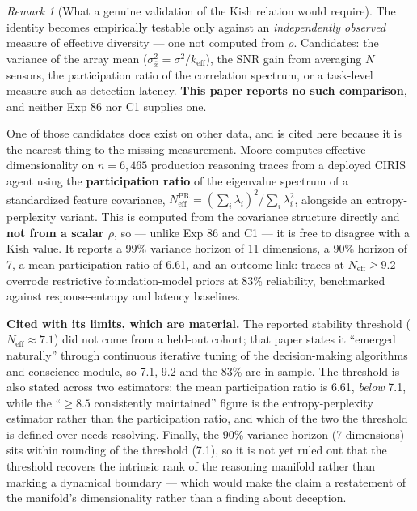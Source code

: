\documentclass[11pt,a4paper]{article}
\theoremstyle{definition}
\theoremstyle{remark}
\newtheorem{remark}{Remark}[section]
\newcommand{\keff}{k_{\text{eff}}}
\begin{document}
\begin{remark}[What a genuine validation of the Kish relation would require]
The identity becomes empirically testable only against an \emph{independently observed} measure of effective diversity --- one not computed from $\rho$. Candidates: the variance of the array mean ($\sigma^2_{\bar{x}} = \sigma^2/\keff$), the SNR gain from averaging $N$ sensors, the participation ratio of the correlation spectrum, or a task-level measure such as detection latency. \textbf{This paper reports no such comparison}, and neither Exp 86 nor C1 supplies one.

One of those candidates does exist on other data, and is cited here because it is the nearest thing to the missing measurement. Moore \cite{crc2026} computes effective dimensionality on $n = 6{,}465$ production reasoning traces from a deployed CIRIS agent using the \textbf{participation ratio} of the eigenvalue spectrum of a standardized feature covariance, $N_{\text{eff}}^{\text{PR}} = (\sum_i \lambda_i)^2 / \sum_i \lambda_i^2$, alongside an entropy-perplexity variant. This is computed from the covariance structure directly and \textbf{not from a scalar $\rho$}, so --- unlike Exp 86 and C1 --- it is free to disagree with a Kish value. It reports a 99\% variance horizon of 11 dimensions, a 90\% horizon of 7, a mean participation ratio of 6.61, and an outcome link: traces at $N_{\text{eff}} \geq 9.2$ overrode restrictive foundation-model priors at 83\% reliability, benchmarked against response-entropy and latency baselines.

\textbf{Cited with its limits, which are material.} The reported stability threshold ($N_{\text{eff}} \approx 7.1$) did not come from a held-out cohort; that paper states it ``emerged naturally'' through continuous iterative tuning of the decision-making algorithms and conscience module, so 7.1, 9.2 and the 83\% are in-sample. The threshold is also stated across two estimators: the mean participation ratio is 6.61, \emph{below} 7.1, while the ``$\geq 8.5$ consistently maintained'' figure is the entropy-perplexity estimator rather than the participation ratio, and which of the two the threshold is defined over needs resolving. Finally, the 90\% variance horizon (7 dimensions) sits within rounding of the threshold (7.1), so it is not yet ruled out that the threshold recovers the intrinsic rank of the reasoning manifold rather than marking a dynamical boundary --- which would make the claim a restatement of the manifold's dimensionality rather than a finding about deception.


\end{remark}
\end{document}
